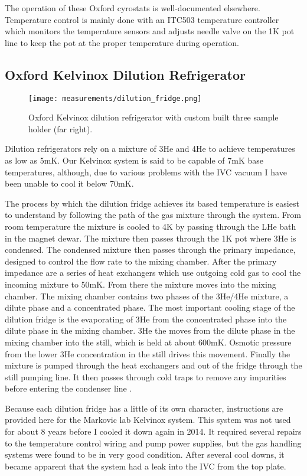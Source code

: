The operation of these Oxford cyrostats is well-documented elsewhere. Temperature control is mainly done with an ITC503 temperature controller which monitors the temperature sensors and adjusts needle valve on the 1K pot line to keep the pot at the proper temperature during operation.

\subsection{Oxford Kelvinox Dilution Refrigerator}

\begin{figure}
    \centering
    \texttt{[image: measurements/dilution\_fridge.png]}
    \caption{Oxford Kelvinox dilution refrigerator with custom built three sample holder (far right).}
    \label{fig:kelvinox}
\end{figure}

Dilution refrigerators rely on a mixture of 3He and 4He to achieve temperatures as low as 5mK. Our Kelvinox system is said to be capable of 7mK base temperatures, although, due to various problems with the IVC vacuum I have been unable to cool it below 70mK.

The process by which the dilution fridge achieves its based temperature is easiest to understand by following the path of the gas mixture through the system. From room temperature the mixture is cooled to 4K by passing through the LHe bath in the magnet dewar. The mixture then passes through the 1K pot where 3He is condensed. The condensed mixture then passes through the primary impedance, designed to control the flow rate to the mixing chamber. After the primary impedance are a series of heat exchangers which use outgoing cold gas to cool the incoming mixture to 50mK. From there the mixture moves into the mixing chamber. The mixing chamber contains two phases of the 3He/4He mixture, a dilute phase and a concentrated phase. The most important cooling stage of the dilution fridge is the evaporating of 3He from the concentrated phase into the dilute phase in the mixing chamber. 3He the moves from the dilute phase in the mixing chamber into the still, which is held at about 600mK. Osmotic pressure from the lower 3He concentration in the still drives this movement. Finally the mixture is pumped through the heat exchangers and out of the fridge through the still pumping line. It then passes through cold traps to remove any impurities before entering the condenser line \cite{Balshaw2001}.

Because each dilution fridge has a little of its own character, instructions are provided here for the Markovic lab Kelvinox system. This system was not used for about 8 years before I cooled it down again in 2014. It required several repairs to the temperature control wiring and pump power supplies, but the gas handling systems were found to be in very good condition. After several cool downs, it became apparent that the system had a leak into the IVC from the top plate. 

